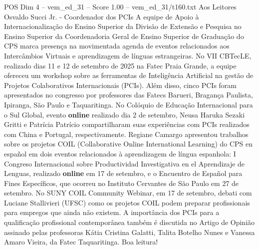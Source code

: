 \begin{textsample}{POS Dim 4 – vem\_ed\_31 – Score 1.00 – vem\_ed\_31/t160.txt}  \label{ex:f4_pos_147}
Aos Leitores Osvaldo Succi Jr. - Coordenador dos PCIs A equipe de Apoio à Internacionalização do Ensino Superior da Divisão de Extensão e Pesquisa no Ensino Superior da Coordenadoria Geral de Ensino Superior de Graduação do CPS marca presença na movimentada agenda de eventos relacionados aos Intercâmbios Virtuais e aprendizagem de línguas estrangeiras.
No VII CBTecLE, realizado dias 11 e 12 de setembro de 2025 na Fatec Praia Grande, a equipe ofereceu um workshop sobre as ferramentas de Inteligência Artificial na gestão de Projetos Colaborativos Internacionais (PCIs).
Além disso, cinco PCIs foram apresentados no congresso por professores das Fatecs Barueri, Bragança Paulista, Ipiranga, São Paulo e Taquaritinga.
No Colóquio de Educação Internacional para o Sul Global, evento \textbf{online} realizado dia 2 de setembro, Neusa Haruka Sezaki Gritti e Patrícia Patrício compartilharam suas experiências com PCIs realizados com China e Portugal, respectivamente.
Regiane Camargo apresentou trabalhos sobre os projetos COIL (Collaborative Online International Learning) do CPS en español em dois eventos relacionados à aprendizagem de língua espanhola: I Congreso Internacional sobre Productividad Investigativa en el Aprendizaje de Lenguas, realizado \textbf{online} em 17 de setembro, e o Encuentro de Español para Fines Específicos, que ocorreu no Instituto Cervantes de São Paulo em 27 de setembro.
No SUNY COIL Community Webinar, em 17 de setembro, debati com Luciane Stallivieri (UFSC) como os projetos COIL podem preparar profissionais para empregos que ainda não existem.
A importância dos PCIs para a qualificação profissional contemporânea também é discutida no Artigo de Opinião assinado pelas professoras Kátia Cristina Galatti, Talita Botelho Nunes e Vanessa Amaro Vieira, da Fatec Taquaritinga.
Boa leitura!

\end{textsample}
